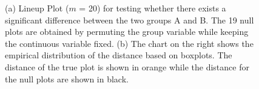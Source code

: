 \documentclass[12]{article}
\begin{document}
\begin{figure}[hbtp]
\centering
{}
\label{dist2}
	\vspace{-.1in}
\caption[Optional caption for list of figures]{(a) Lineup Plot ($m$ = 20) for testing whether there exists a significant difference between the two groups A and B. The 19 null plots are obtained by permuting the group variable while keeping the continuous variable fixed.  (b) The chart on the right shows the empirical distribution of the distance based on boxplots. The distance of the true plot is shown in orange while the distance for the null plots are shown in black. }
\end{figure}
\end{document}
